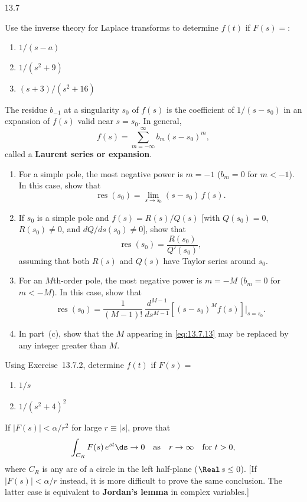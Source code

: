 \begin{exercises}{13.7}

\item Use the inverse theory for Laplace transforms to determine $f(t)$ if $F(s) =$:
\begin{enumerate}
\item[(a)] $1/(s-a)$
\item[\starred(b)] $1/(s^2+9)$
\item[(c)] $(s+3)/(s^2+16)$
\end{enumerate}

\item The residue $b_{-1}$ at a singularity $s_0$ of $f(s)$ is the coefficient of $1/(s-s_0)$ in an expansion of $f(s)$ valid near $s = s_0$.  In general,
\[
f(s) = \sum_{m=-\infty}^{\infty} b_m(s-s_0)^m,
\]
called a \textbf{Laurent series or expansion}.
\begin{enumerate}
\item[(a)] For a simple pole, the most negative power is $m = -1$ ($b_m = 0$ for $m < -1$).  In this case, show that
\[
\operatorname{res}(s_0) = \lim_{s\to s_0}(s-s_0)\,f(s).
\]
\item[(b)] If $s_0$ is a simple pole and $f(s) = R(s)/Q(s)$ [with $Q(s_0) = 0$, $R(s_0) \ne 0$, and $dQ/ds(s_0) \ne 0$], show that
\[
\operatorname{res}(s_0) = \frac{R(s_0)}{Q'(s_0)},
\]
assuming that both $R(s)$ and $Q(s)$ have Taylor series around $s_0$.
\item[(c)] For an $M$th-order pole, the most negative power is $m = -M$ ($b_m = 0$ for $m < -M$).  In this case, show that
\begin{equation}
\operatorname{res}(s_0) = \frac{1}{(M-1)!}\,\frac{d^{M-1}}{ds^{M-1}}\left[(s-s_0)^M f(s)\right]\bigg|_{s=s_0}.
\label{eq:13.7.13}
\end{equation}
\item[(d)] In part~(c), show that the $M$ appearing in \eqref{eq:13.7.13} may be replaced by any integer greater than $M$.
\end{enumerate}

\item Using Exercise~13.7.2, determine $f(t)$ if $F(s) =$
\begin{enumerate}
\item[(a)] $1/s$
\item[(b)] $1/(s^2+4)^2$
\end{enumerate}

\item If $|F(s)| < \alpha/r^2$ for large $r \equiv |s|$, prove that
\[
\int_{C_R} F(s)\,e^{st}\ds \to 0 \quad\text{as}\quad r \to \infty \quad\text{for } t > 0,
\]
where $C_R$ is any arc of a circle in the left half-plane ($\Real\,s \le 0$).
[If $|F(s)| < \alpha/r$ instead, it is more difficult to prove the same conclusion.  The latter case is equivalent to \textbf{Jordan's lemma} in complex variables.]

\end{exercises}

